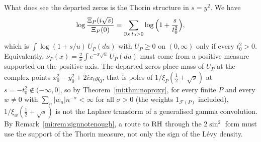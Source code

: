 What does see the departed zeros is the Thorin structure in $s=y^2$. We have
\[
\log\frac{\Xi_P(i\sqrt s)}{\Xi_P(0)}=\sum_{\operatorname{Re} t_0>0}\log\Big(1+\frac s{t_0^2}\Big),
\]
which is $\int\log(1+s/u)\,U_P(du)$ with $U_P\ge0$ on $(0,\infty)$ only if every $t_0^2>0$. Equivalently, $\nu_P(x)=\frac2x\int e^{-x\sqrt u}\,U_P(du)$ must come from a positive measure supported on the positive axis. The departed zeros place mass of $U_P$ at the complex points $x_0^2-y_0^2+2ix_0y_0$, that is poles of $1/\xi_P(\tfrac12+\sqrt s)$ at $s=-t_0^2\notin(-\infty,0]$, so by Theorem~\ref{mi:thm:noproxy}, for every finite $P$ and every $w\ne0$ with $\sum_n|w_n|n^{-\sigma}<\infty$ for all $\sigma>0$ (the weights $1_{\mathcal F(P)}$ included), $1/\xi_w(\tfrac12+\sqrt s)$ is not the Laplace transform of a generalised gamma convolution. By Remark~\ref{mi:rem:signnotenough}, a route to $\mathrm{RH}$ through the $2\sin^2$ form must use the support of the Thorin measure, not only the sign of the L\'evy density.
